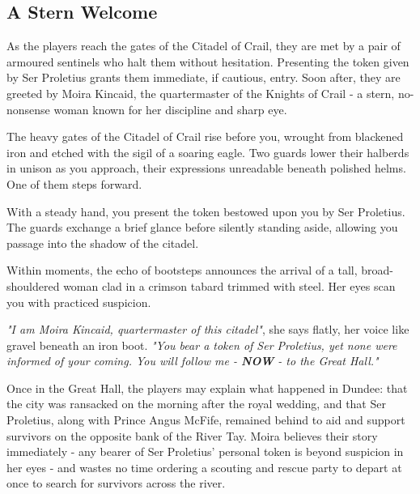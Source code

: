 \subsection*{A Stern Welcome}
{\entryfont As the players reach the gates of the Citadel of Crail, they are met by a pair of armoured sentinels who halt them without hesitation. Presenting the token given by Ser Proletius grants them immediate, if cautious, entry. Soon after, they are greeted by Moira Kincaid, the quartermaster of the Knights of Crail - a stern, no-nonsense woman known for her discipline and sharp eye.}
\begin{DndReadAloud}
	The heavy gates of the Citadel of Crail rise before you, wrought from blackened iron and etched with the sigil of a soaring eagle. Two guards lower their halberds in unison as you approach, their expressions unreadable beneath polished helms. One of them steps forward.
	
	With a steady hand, you present the token bestowed upon you by Ser Proletius. The guards exchange a brief glance before silently standing aside, allowing you passage into the shadow of the citadel.

	Within moments, the echo of bootsteps announces the arrival of a tall, broad-shouldered woman clad in a crimson tabard trimmed with steel. Her eyes scan you with practiced suspicion.
	
	\textit{"I am Moira Kincaid, quartermaster of this citadel"}, she says flatly, her voice like gravel beneath an iron boot. \textit{"You bear a token of Ser Proletius, yet none were informed of your coming. You will follow me - \textbf{NOW} - to the Great Hall."}
\end{DndReadAloud}
{\noindent\entryfont Once in the Great Hall, the players may explain what happened in Dundee: that the city was ransacked on the morning after the royal wedding, and that Ser Proletius, along with Prince Angus McFife, remained behind to aid and support survivors on the opposite bank of the River Tay. Moira believes their story immediately - any bearer of Ser Proletius' personal token is beyond suspicion in her eyes - and wastes no time ordering a scouting and rescue party to depart at once to search for survivors across the river.}

